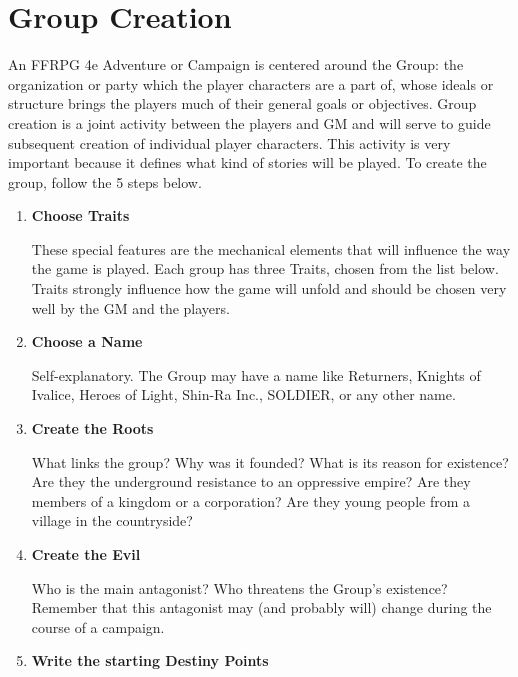 \label{ch:setup}
\begin{center}
\end{center}

\section{Group Creation}
\label{sec:group}
\begin{multicols}{2}
An FFRPG 4e Adventure or Campaign is centered around the Group: the organization or party which the player characters are a part of, whose ideals or structure brings the players much of their general goals or objectives. Group creation is a joint activity between the players and GM and will serve to guide subsequent creation of individual player characters. This activity is very important because it defines what kind of stories will be played. To create the group, follow the 5 steps below.
\begin{enumerate}

\item \textbf{Choose Traits}

These special features are the mechanical elements that will influence the way the game is played. Each group has three Traits, chosen from the list below. Traits strongly influence how the game will unfold and should be chosen very well by the GM and the players.

\item \textbf{Choose a Name}

Self-explanatory. The Group may have a name like Returners, Knights of Ivalice, Heroes of Light, Shin-Ra Inc., SOLDIER, or any other name.

\item \textbf{Create the Roots}

What links the group? Why was it founded? What is its reason for existence? Are they the underground resistance to an oppressive empire? Are they members of a kingdom or a corporation? Are they young people from a village in the countryside?

\item \textbf{Create the Evil}

Who is the main antagonist? Who threatens the Group’s existence? Remember that this antagonist may (and probably will) change during the course of a campaign.

\item \textbf{Write the starting Destiny Points}


\end{enumerate}
\end{multicols}
